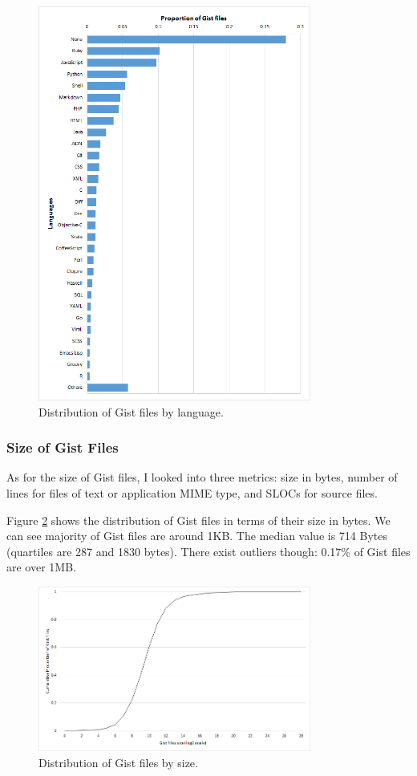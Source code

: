 \begin{figure}[!htbp]
	\centering
	\includegraphics[width=0.8\textwidth]{figures/languageDistribution.png}
	\caption{Distribution of Gist files by language.}
	\label{fig:languageDist}
\end{figure}

\subsubsection{Size of Gist Files}
As for the size of Gist files, I looked into three metrics: size in bytes, number of lines for files of text or application MIME type, and SLOCs for source files. 

Figure \ref{fig:size} shows the distribution of Gist files in terms of their size in bytes. We can see majority of Gist files are around 1KB. The median value is 714 Bytes (quartiles are 287 and 1830 bytes). There exist outliers though: 0.17\% of Gist files are over 1MB.

\begin{figure}[!htb]
	\centering
	\includegraphics[width=0.8\textwidth]{figures/gist_file_size_log.png}
	\caption{Distribution of Gist files by size.}
	\label{fig:size}
\end{figure}

